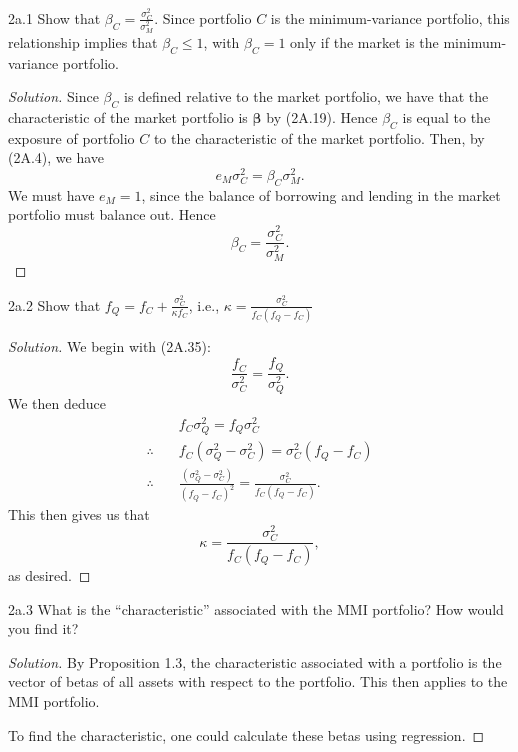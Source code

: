 
\begin{problem}{2a.1}
Show that $\beta_{C} = \frac{\sigma_{C}^{2}}{\sigma_{M}^{2}}$. Since portfolio $C$ is the minimum-variance portfolio, this relationship implies that $\beta_{C} \leqslant 1$, with $\beta_{C} = 1$ only if the market is the minimum-variance portfolio.
\end{problem}

\begin{proof}[Solution]
Since $\beta_{C}$ is defined relative to the market portfolio, we have that the characteristic of the market portfolio is $\mathbf{\beta}$ by (2A.19). Hence $\beta_{C}$ is equal to the exposure of portfolio $C$ to the characteristic of the market portfolio. Then, by (2A.4), we have \[e_{M}\sigma_{C}^{2} = \beta_{C}\sigma_{M}^{2}.\] We must have $e_{M} = 1$, since the balance of borrowing and lending in the market portfolio must balance out. Hence \[\beta_{C} = \frac{\sigma_{C}^{2}}{\sigma_{M}^{2}}.\]
\end{proof}

\begin{problem}{2a.2}
Show that $f_{Q} = f_{C} + \frac{\sigma_{C}^{2}}{\kappa f_{C}}$, i.e., $\kappa = \frac{\sigma_{C}^{2}}{f_{C}(f_{Q} - f_{C})}$
\end{problem}

\begin{proof}[Solution]
We begin with (2A.35):
\[\frac{f_{C}}{\sigma_{C}^{2}} = \frac{f_{Q}}{\sigma_{Q}^{2}}.\]
We then deduce
\begin{align*}
&f_{C}\sigma_{Q}^{2} = f_{Q}\sigma_{C}^{2}\\
\therefore \quad &f_{C}(\sigma_{Q}^{2} - \sigma_{C}^{2}) = \sigma_{C}^{2}(f_{Q} - f_{C})\\
\therefore \quad &\frac{(\sigma_{Q}^{2} - \sigma_{C}^{2})}{(f_{Q} - f_{C})^{2}} = \frac{\sigma_{C}^{2}}{f_{C}(f_{Q} - f_{C})}.
\end{align*}
This then gives us that \[\kappa = \frac{\sigma_{C}^{2}}{f_{C}(f_{Q} - f_{C})},\] as desired.
\end{proof}

\begin{problem}{2a.3}
What is the ``characteristic'' associated with the MMI portfolio? How would you find it?
\end{problem}

\begin{proof}[Solution]
By Proposition 1.3, the characteristic associated with a portfolio is the vector of betas of all assets with respect to the portfolio. This then applies to the MMI portfolio.

To find the characteristic, one could calculate these betas using regression.
\end{proof}

